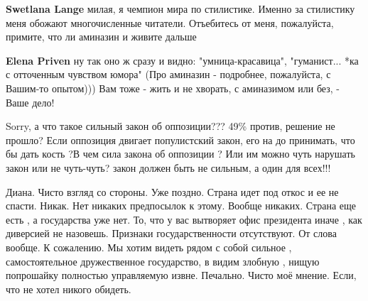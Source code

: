 \begin{itemize}
\begin{itemize}
\textbf{Swetlana Lange} милая, я чемпион мира по стилистике. Именно за стилистику меня обожают многочисленные читатели. Отъебитесь от меня, пожалуйста, примите, что ли аминазин и живите дальше

 
\textbf{Elena Priven} ну так оно ж сразу и видно: "умница-красавица", "гуманист... *ка с отточенным чувством юмора" \Laughey[1.0][white] (Про аминазин - подробнее, пожалуйста, с Вашим-то опытом))) Вам тоже - жить и не хворать, с аминазимом или без, - Ваше дело!
\end{itemize}

 

Sorry, а что такое сильный закон об оппозиции??? 49\% против, решение не
прошло? Если оппозиция двигает популистский закон, его на до принимать, что бы
дать кость ?В чем сила закона об оппозиции ? Или им можно чуть нарушать закон
или не чуть-чуть? закон должен быть не сильным, а один для всех!!!


 

Диана. Чисто взгляд со стороны. Уже поздно. Страна идет под откос и ее не
спасти. Никак. Нет никаких предпосылок к этому. Вообще никаких. Страна еще есть
, а государства уже нет. То, что у вас вытворяет офис президента иначе , как
диверсией не назовешь. Признаки государственности отсутствуют. От слова вообще.
К сожалению. Мы хотим видеть рядом с собой сильное , самостоятельное
дружественное государство, в видим злобную , нищую попрошайку полностью
управляемую извне. Печально. Чисто моё мнение. Если, что не хотел никого
обидеть.

\begin{itemize}
 

\end{itemize}
\end{itemize}
